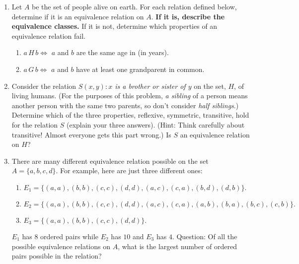 \documentclass[11pt]{amsart}
\begin{document}
\begin{enumerate}

\item Let $A$ be the set of people alive on earth. 
For each relation defined below, determine if
it is an equivalence relation on $A$. {\bf If it is, describe the equivalence classes.}
If it is not, determine which properties of an equivalence relation fail.\\[3pt]

\begin{enumerate}

\item $a\,H\,b \iff$  $a$ and $b$ are the same age in (in years).\\[3pt]

\item $a\,G\,b \iff$  $a$ and $b$ have at least one grandparent in common.\\[5pt]

\end{enumerate}

\item Consider the relation {\it $S(x,y) : x$ is a brother or sister of $y$} on the set, $H$,
of living humans. (For the purposes of this problem, {\itshape a sibling} of a person means another person  with the same two parents, so don't consider {\itshape half siblings}.) Determine which of the three properties, reflexive, symmetric, transitive,
hold for the relation $S$ (explain your three answers). (Hint: Think carefully about transitive! Almost everyone gets this part wrong.) 
Is $S$ an  equivalence relation on $H$?\\[5pt]

\item  There are many different equivalence relation possible on the set $A=\{a,b,c,d\}$. For example,
here are just three different ones:\\[3pt]
\begin{enumerate} 
\item$E_{1} = \{(a,a), (b,b), (c,c), (d,d), (a,c), (c,a),(b,d),(d,b)\}.$\\[3pt]
\item$E_{2} = \{(a,a), (b,b), (c,c), (d,d), (a,c), (c,a),(a,b),(b,a),(b,c),(c,b)\}.$\\[3pt]
\item $E_{3} = \{(a,a), (b,b), (c,c), (d,d)\}.$\\[3pt]
\end{enumerate}

$E_{1}$ has $8$ ordered pairs while $E_{2}$ has $10$ and $E_{3}$ has $4$. Question: Of all the possible equivalence relations on $A$, what is the largest number of ordered pairs possible in the relation?\\[5pt]




\end{enumerate}
\end{document}
